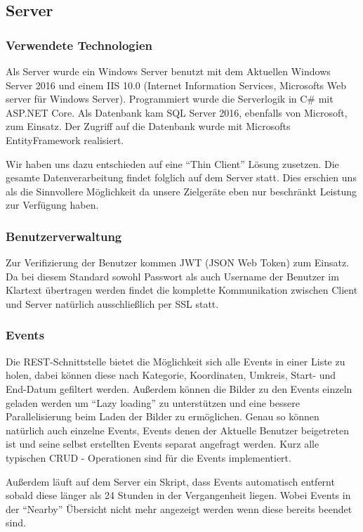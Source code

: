 \documentclass{scrartcl}
\begin{document}
\subsection{Server}
\subsubsection{Verwendete Technologien}

Als Server wurde ein Windows Server benutzt mit dem Aktuellen Windows Server 2016 und einem IIS 10.0 (Internet Information Services, Microsofts Web server für Windows Server). Programmiert wurde die Serverlogik in C\# mit ASP.NET Core. Als Datenbank kam SQL Server 2016, ebenfalls von Microsoft, zum Einsatz. Der Zugriff auf die Datenbank wurde mit Microsofts EntityFramework realisiert.

Wir haben uns dazu entschieden auf eine \enquote{Thin Client} Lösung zusetzen. Die gesamte Datenverarbeitung findet folglich auf dem Server statt. Dies erschien uns als die Sinnvollere Möglichkeit da unsere Zielgeräte eben nur beschränkt Leistung zur Verfügung haben. 

\subsubsection{Benutzerverwaltung}

Zur Verifizierung der Benutzer kommen JWT (JSON Web Token) zum Einsatz. Da bei diesem Standard sowohl Passwort als auch Username der Benutzer im Klartext übertragen werden findet die komplette Kommunikation zwischen Client und Server natürlich ausschließlich per SSL statt. 

\subsubsection{Events}

Die REST-Schnittstelle bietet die Möglichkeit sich alle Events in einer Liste zu holen, dabei können diese nach Kategorie, Koordinaten, Umkreis, Start- und End-Datum gefiltert werden.
Außerdem können die Bilder zu den Events einzeln geladen werden um \enquote{Lazy loading} zu unterstützen und eine bessere Parallelisierung beim Laden der Bilder zu ermöglichen.
Genau so können natürlich auch einzelne Events, Events denen der Aktuelle Benutzer beigetreten ist und seine selbst erstellten Events separat angefragt werden. Kurz alle typischen CRUD - Operationen sind für die Events implementiert.

Außerdem läuft auf dem Server ein Skript, dass Events automatisch entfernt sobald diese länger als 24 Stunden in der Vergangenheit liegen. Wobei Events in der \enquote{Nearby} Übersicht nicht mehr angezeigt werden wenn diese bereits beendet sind.
\end{document}
